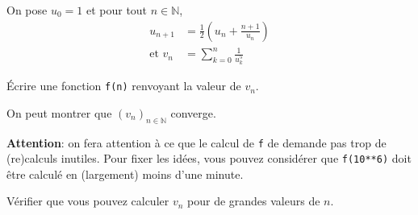\exer{}
\setcounter{numques}{0}

 On pose $u_{0} = 1$ et pour tout $n\in \mathbb{N}$,
\begin{align*}
  u_{n+1} &= \frac{1}{2}\left(u_{n}+\frac{n+1}{u_{n}}\right)\\
\text{et } v_{n} &= \sum_{k=0}^{n} \frac{1}{u_{k}^{5}}
\end{align*}

\question{} Écrire une fonction \texttt{f(n)} renvoyant la valeur de
  $v_{n}$.

On peut montrer que $\left(v_{n}\right)_{n\in \mathbb{N}}$ converge.

\textbf{Attention}: on fera attention à ce que le calcul de \texttt{f}
de demande  pas trop de (re)calculs inutiles. Pour fixer les idées,
vous  pouvez considérer  que  \texttt{f(10**6)} doit être calculé  en
(largement) moins d'une minute.

\question{} Vérifier que vous pouvez calculer $v_{n}$ pour de grandes valeurs de $n$.

